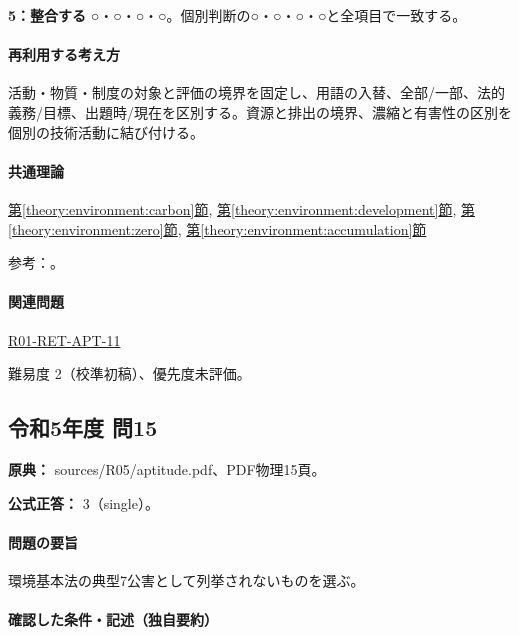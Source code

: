 \noindent\textbf{5：整合する} ○・○・○・○。個別判断の○・○・○・○と全項目で一致する。\par

\paragraph{再利用する考え方} 活動・物質・制度の対象と評価の境界を固定し、用語の入替、全部/一部、法的義務/目標、出題時/現在を区別する。資源と排出の境界、濃縮と有害性の区別を個別の技術活動に結び付ける。

\paragraph{共通理論} \hyperref[theory:environment:carbon]{第\ref*{theory:environment:carbon}節}, \hyperref[theory:environment:development]{第\ref*{theory:environment:development}節}, \hyperref[theory:environment:zero]{第\ref*{theory:environment:zero}節}, \hyperref[theory:environment:accumulation]{第\ref*{theory:environment:accumulation}節}

\par 参考：\cite{env_offset2008,env_development,env_zero2008,env_accumulation}。

\paragraph{関連問題} \hyperref[q:r01-ret-apt-11]{R01-RET-APT-11}

\par 難易度 2（校準初稿）、優先度未評価。

\subsection{令和5年度 問15}
\label{q:r05-reg-apt-15}

\noindent\textbf{原典：} sources/R05/aptitude.pdf、PDF物理15頁。

\textbf{公式正答：} 3（single）。

\paragraph{問題の要旨} 環境基本法の典型7公害として列挙されないものを選ぶ。

\paragraph{確認した条件・記述（独自要約）}\mbox{}\par

